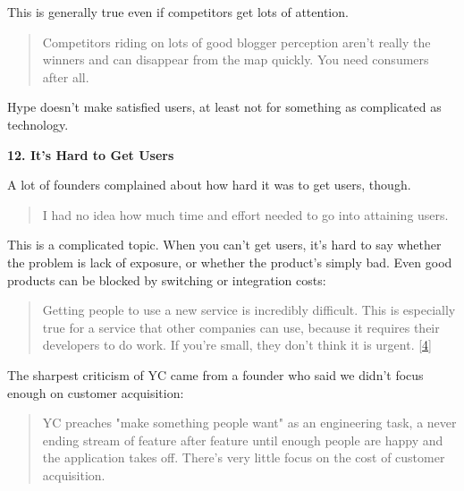                   This is generally true even if competitors get lots of
                  attention.
                  \begin{quote}

                    Competitors riding on lots of good blogger perception aren't
                    really the winners and can disappear from the map quickly.
                    You need consumers after all.
                  
\end{quote}

                  Hype doesn't make satisfied users, at least not for something
                  as complicated as technology.

\textbf{12. It's Hard to Get Users}

A lot of founders complained about how hard it
                  was to get users, though.
                  \begin{quote}

                    I had no idea how much time and effort needed to go into
                    attaining users.
                  
\end{quote}

                  This is a complicated topic. When you can't get users, it's
                  hard to say whether the problem is lack of exposure, or
                  whether the product's simply bad. Even good products can be
                  blocked by switching or integration costs:
                  \begin{quote}

                    Getting people to use a new service is incredibly difficult.
                    This is especially true for a service that other companies
                    can use, because it requires their developers to do work. If
                    you're small, they don't think it is urgent.
                    [\href{\#f4n}{4}]
                  
\end{quote}

                  The sharpest criticism of YC came from a founder who said we
                  didn't focus enough on customer acquisition:
                  \begin{quote}

                    YC preaches "make something people want" as an engineering
                    task, a never ending stream of feature after feature until
                    enough people are happy and the application takes off.
                    There's very little focus on the cost of customer
                    acquisition.
                  
\end{quote}

